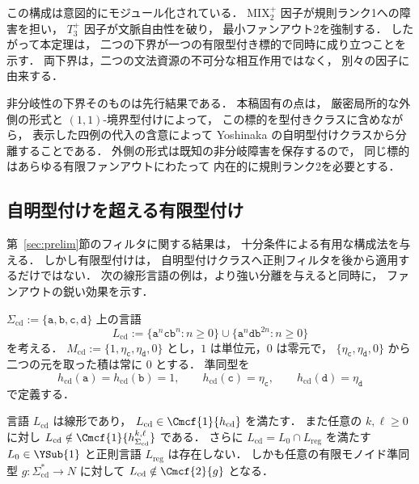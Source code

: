 この構成は意図的にモジュール化されている．
$\mathrm{MIX}_2^+$ 因子が規則ランク1への障害を担い，
$T_3^+$ 因子が文脈自由性を破り，
最小ファンアウト2を強制する．
したがって本定理は，
二つの下界が一つの有限型付き標的で同時に成り立つことを示す．
両下界は，二つの文法資源の不可分な相互作用ではなく，
別々の因子に由来する．

非分岐性の下界そのものは先行結果である．
本稿固有の点は，
厳密局所的な外側の形式と $(1,1)$-境界型付けによって，
この標的を型付きクラスに含めながら，
表示した四例の代入の含意によって
Yoshinaka の自明型付けクラスから分離することである．
外側の形式は既知の非分岐障害を保存するので，
同じ標的はあらゆる有限ファンアウトにわたって
内在的に規則ランク2を必要とする．

\subsection{自明型付けを超える有限型付け}
\label{subsec:finite-typing-separations}

第~\ref{sec:prelim}節のフィルタに関する結果は，
十分条件による有用な構成法を与える．
しかし有限型付けは，
自明型付けクラスへ正則フィルタを後から適用するだけではない．
次の線形言語の例は，より強い分離を与えると同時に，
ファンアウトの鋭い効果を示す．

$\Sigma_{\mathrm{cd}}
:=\{\mathtt a,\mathtt b,\mathtt c,\mathtt d\}$
上の言語
\[
 L_{\mathrm{cd}}
 :=\{\mathtt a^n\mathtt c\mathtt b^n:n\ge0\}
 \cup
 \{\mathtt a^n\mathtt d\mathtt b^{2n}:n\ge0\}
\]
を考える．
$M_{\mathrm{cd}}
:=\{1,\eta_{\mathtt c},\eta_{\mathtt d},0\}$
とし，$1$ は単位元，$0$ は零元で，
$\{\eta_{\mathtt c},\eta_{\mathtt d},0\}$
から二つの元を取った積は常に $0$ とする．
準同型を
\[
 h_{\mathrm{cd}}(\mathtt a)
 =h_{\mathrm{cd}}(\mathtt b)=1,\qquad
 h_{\mathrm{cd}}(\mathtt c)=\eta_{\mathtt c},
 \qquad
 h_{\mathrm{cd}}(\mathtt d)=\eta_{\mathtt d}
\]
で定義する．

\begin{proposition}[ファンアウトに敏感な型付き言語]
\label{prop:strong-fanout-separation}
言語 $L_{\mathrm{cd}}$ は線形であり，
\(L_{\mathrm{cd}}\in\Cmcf{1}{h_{\mathrm{cd}}}\)
を満たす．
また任意の $k,\ell\ge0$ に対し
\(L_{\mathrm{cd}} \notin\Cmcf{1}{h_{\Sigma_{\mathrm{cd}}}^{k,\ell}}\)
である．
さらに
$L_{\mathrm{cd}}=L_0\cap L_{\mathrm{reg}}$
を満たす
$L_0\in\YSub{1}$ と正則言語 $L_{\mathrm{reg}}$
は存在しない．
しかも任意の有限モノイド準同型
$g:\Sigma_{\mathrm{cd}}^*\to N$ に対して
\(L_{\mathrm{cd}}\notin\Cmcf{2}{g}\)
となる．
\end{proposition}

